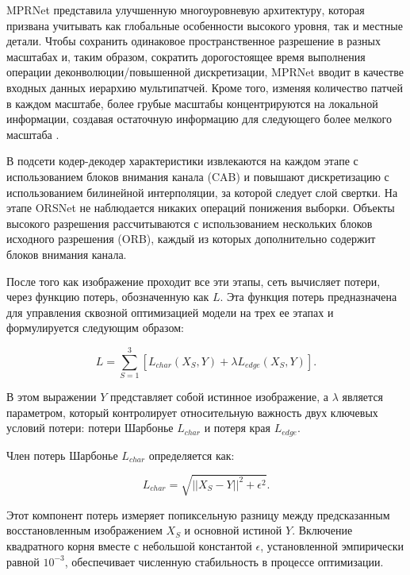 MPRNet представила улучшенную многоуровневую архитектуру, которая призвана учитывать как глобальные особенности высокого уровня, так и местные детали. Чтобы сохранить одинаковое пространственное разрешение в разных масштабах и, таким образом, сократить дорогостоящее время выполнения операции деконволюции/повышенной дискретизации, MPRNet вводит в качестве входных данных иерархию мультипатчей. Кроме того, изменяя количество патчей в каждом масштабе, более грубые масштабы концентрируются на локальной информации, создавая остаточную информацию для следующего более мелкого масштаба \cite{rajaei2023analysis}.

В подсети кодер-декодер характеристики извлекаются на каждом этапе с использованием блоков внимания канала (CAB) и повышают дискретизацию с использованием билинейной интерполяции, за которой следует слой свертки. На этапе ORSNet не наблюдается никаких операций понижения выборки. Объекты высокого разрешения рассчитываются с использованием нескольких блоков исходного разрешения (ORB), каждый из которых дополнительно содержит блоков внимания канала.

После того как изображение проходит все эти этапы, сеть вычисляет потери, через функцию потерь, обозначенную как \(L\). Эта функция потерь предназначена для управления сквозной оптимизацией модели на трех ее этапах и формулируется следующим образом:

\begin{equation}
	L = \sum_{S=1}^{3} [L_{char}(X_S, Y) + \lambda L_{edge}(X_S, Y)].
\end{equation}

В этом выражении \( Y \) представляет собой истинное изображение, а \( \lambda \) является параметром, который контролирует относительную важность двух ключевых условий потери: потери Шарбонье \( L_{char} \) и потеря края \( L_{edge} \).

Член потерь Шарбонье \( L_{char} \) определяется как:

\begin{equation}
	L_{char} = \sqrt{\vert\vert X_S - Y \vert\vert^2 + \epsilon^2}.
\end{equation}

Этот компонент потерь измеряет попиксельную разницу между предсказанным восстановленным изображением \( X_S \) и основной истиной \( Y \). Включение квадратного корня вместе с небольшой константой \( \epsilon \), установленной эмпирически равной \( 10^{-3} \), обеспечивает численную стабильность в процессе оптимизации.

